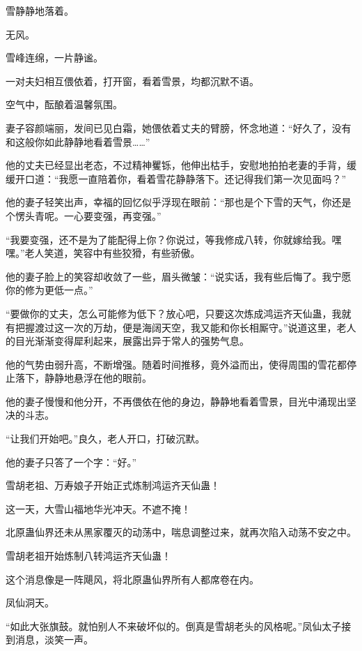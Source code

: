 
\begin{this_body}



雪静静地落着。

无风。

雪峰连绵，一片静谧。

一对夫妇相互偎依着，打开窗，看着雪景，均都沉默不语。

空气中，酝酿着温馨氛围。

妻子容颜端丽，发间已见白霜，她偎依着丈夫的臂膀，怀念地道：“好久了，没有和这般你如此静静地看着雪景……”

他的丈夫已经显出老态，不过精神矍铄，他伸出枯手，安慰地拍拍老妻的手背，缓缓开口道：“我愿一直陪着你，看着雪花静静落下。还记得我们第一次见面吗？”

他的妻子轻笑出声，幸福的回忆似乎浮现在眼前：“那也是个下雪的天气，你还是个愣头青呢。一心要变强，再变强。”

“我要变强，还不是为了能配得上你？你说过，等我修成八转，你就嫁给我。嘿嘿。”老人笑道，笑容中有些狡猾，有些骄傲。

他的妻子脸上的笑容却收敛了一些，眉头微皱：“说实话，我有些后悔了。我宁愿你的修为更低一点。”

“要做你的丈夫，怎么可能修为低下？放心吧，只要这次炼成鸿运齐天仙蛊，我就有把握渡过这一次的万劫，便是海阔天空，我又能和你长相厮守。”说道这里，老人的目光渐渐变得犀利起来，展露出异于常人的强势气息。

他的气势由弱升高，不断增强。随着时间推移，竟外溢而出，使得周围的雪花都停止落下，静静地悬浮在他的眼前。

他的妻子慢慢和他分开，不再偎依在他的身边，静静地看着雪景，目光中涌现出坚决的斗志。

“让我们开始吧。”良久，老人开口，打破沉默。

他的妻子只答了一个字：“好。”

雪胡老祖、万寿娘子开始正式炼制鸿运齐天仙蛊！

这一天，大雪山福地华光冲天。不遮不掩！

北原蛊仙界还未从黑家覆灭的动荡中，喘息调整过来，就再次陷入动荡不安之中。

雪胡老祖开始炼制八转鸿运齐天仙蛊！

这个消息像是一阵飓风，将北原蛊仙界所有人都席卷在内。

凤仙洞天。

“如此大张旗鼓。就怕别人不来破坏似的。倒真是雪胡老头的风格呢。”凤仙太子接到消息，淡笑一声。


\end{this_body}
